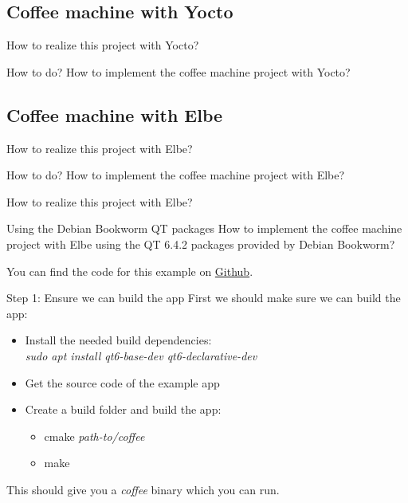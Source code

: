 \documentclass{beamer}
\begin{document}
\subsection{Coffee machine with Yocto}

\begin{frame}{How to realize this project with Yocto?}
	\begin{block}{How to do?}
		How to implement the coffee machine project with Yocto?
	\end{block}
\end{frame}

\subsection{Coffee machine with Elbe}

\begin{frame}{How to realize this project with Elbe?}
	\begin{block}{How to do?}
		How to implement the coffee machine project with Elbe?
	\end{block}
\end{frame}

\begin{frame}{How to realize this project with Elbe?}
	\begin{block}{Using the Debian Bookworm QT packages}
		How to implement the coffee machine project with Elbe using the QT 6.4.2 packages provided by Debian Bookworm?
	\end{block}

	You can find the code for this example on
	\href{https://github.com/tomirgang/eh21_maintainable_linux/tree/main/examples/elbe_advanced}{Github}.
\end{frame}


\begin{frame}{Step 1: Ensure we can build the app}
	First we should make sure we can build the app:
	\begin{itemize}
		\item Install the needed build dependencies:\\
			\emph{sudo apt install qt6-base-dev qt6-declarative-dev}
		\item Get the source code of the example app
		\item Create a build folder and build the app:
		\begin{itemize}
			\item cmake \emph{path-to/coffee}
			\item make
		\end{itemize}
	\end{itemize}
	This should give you a \emph{coffee} binary which you can run.
\end{frame}
\end{document}
